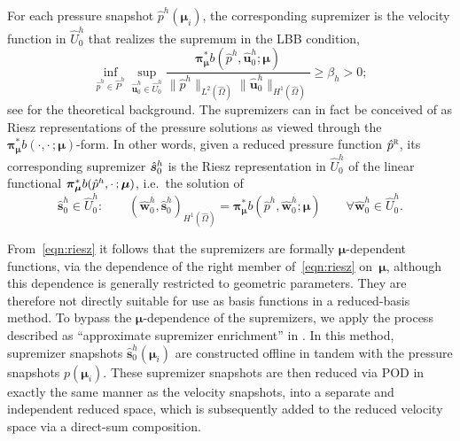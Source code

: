 \documentclass[onecolumn, twoside, a4paper, 11pt]{article}
\begin{document}
For each pressure snapshot $\hat{p}^h(\bm{\mu}_i)$, the corresponding supremizer is the
velocity function in $\hat{U}^h_0$ that realizes the supremum in the LBB condition,
%
\begin{equation}
  \label{eqn:lbb}
  \inf_{\hat{p}^h \in \hat{P}^h} \sup_{\hat{\bm u}_0^h \in \hat{U}_0^h}
  \frac{\bm{\pi}^*_{\bm{\mu}}b(\hat{p}^h, \hat{\bm u}^h_0; \bm \mu)}
  {\|\hat{p}^h\|_{L^2(\hat{\Omega})} \|\hat{\bm{u}}_0^h\|_{H^1(\hat{\Omega})}}
  \geq \beta_h > 0;
\end{equation}
%
see \cite{Ballarin2015ssp} for the theoretical background.
%
The supremizers can in fact be conceived of as Riesz representations of the pressure solutions as
viewed through the $\bm{\pi}^*_{\bm{\mu}}b(\cdot,\cdot\,;\bm \mu)$-form. In other words,
given a reduced pressure function $\hat{p}^\textsc{r}$, its corresponding supremizer $\smash[t]{\hat{\bm s}^h_0}$ is
the Riesz representation in $\hat{U}_0^h$ of the linear functional
$\smash[t]{\bm{\pi}^*_{\bm{\mu}}b(\hat{p}^h,\cdot\,; \bm \mu)}$, i.e.~the solution of
%
\begin{equation}
  \label{eqn:riesz}
\hat{\bm s}^h_0\in  \hat{U}^h_0:
\qquad
  \left( \hat{\bm w}^h_0, \hat{\bm s}^h_0 \right)_{H^1(\hat{\Omega})} = \bm{\pi}^*_{\bm{\mu}}b(\hat{p}^h, \hat{\bm w}^h_0; \bm \mu)
  \qquad\forall\hat{\bm w}^h_0 \in \hat{U}^h_0.
\end{equation}
%

From~\eqref{eqn:riesz} it follows that the supremizers are formally $\bm{\mu}$\nobreakdash-dependent functions,
via the dependence of the right member of~\eqref{eqn:riesz} on~$\bm{\mu}$, although this dependence
is generally restricted to geometric parameters. They are therefore not directly suitable for use
as basis functions in a reduced-basis method. To bypass the $\bm{\mu}$\nobreakdash-dependence of the supremizers,
we apply the process described as ``approximate supremizer enrichment'' in
\cite[4.2.3]{Ballarin2015ssp}. In this method, supremizer snapshots $\hat{\bm s}^h_0(\bm\mu_i)$ are constructed
offline in tandem with the pressure snapshots $p(\bm \mu_i)$. These supremizer snapshots are then
reduced via POD in exactly the same manner as the velocity snapshots, into a separate and independent reduced space,
which is subsequently added to the reduced velocity space via a direct-sum composition.
\end{document}
